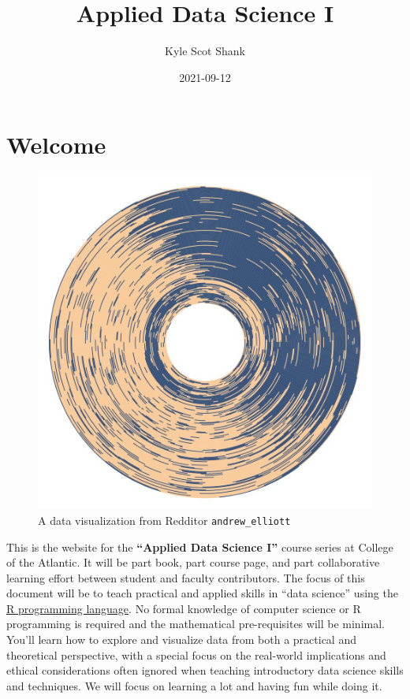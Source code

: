 \documentclass[
]{book}
\title{Applied Data Science I}
\author{Kyle Scot Shank}
\date{2021-09-12}
\begin{document}
\maketitle

{
\setcounter{tocdepth}{1}
\tableofcontents
}
\hypertarget{welcome}{%
\chapter*{Welcome}\label{welcome}}

\begin{figure}
\centering
\includegraphics[width=5.72917in,height=\textheight]{images/cover.png}
\caption{A data visualization from Redditor \texttt{andrew\_elliott}}
\end{figure}

This is the website for the \textbf{``Applied Data Science I''} course series at College of the Atlantic. It will be part book, part course page, and part collaborative learning effort between student and faculty contributors. The focus of this document will be to teach practical and applied skills in ``data science'' using the \href{https://www.r-project.org/}{R programming language}. No formal knowledge of computer science or R programming is required and the mathematical pre-requisites will be minimal. You'll learn how to explore and visualize data from both a practical and theoretical perspective, with a special focus on the real-world implications and ethical considerations often ignored when teaching introductory data science skills and techniques. We will focus on learning a lot and having fun while doing it.
\end{document}
